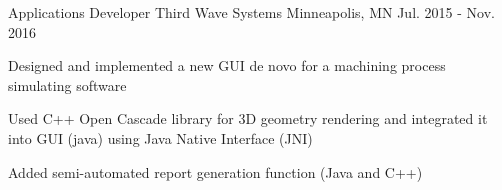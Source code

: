 \begin{cventries}
  \cventry
    {Applications Developer} %
    {Third Wave Systems} %
    {Minneapolis, MN} %
    {Jul. 2015 - Nov. 2016} %
    {
      \begin{cvitems} %
        \item {Designed and implemented a new GUI de novo for a machining process simulating software}
        \item {Used C++ Open Cascade library for 3D geometry rendering and integrated it into GUI (java) using Java Native Interface (JNI)}
        \item {Added semi-automated report generation function (Java and C++)}
      \end{cvitems}
    }


\end{cventries}

